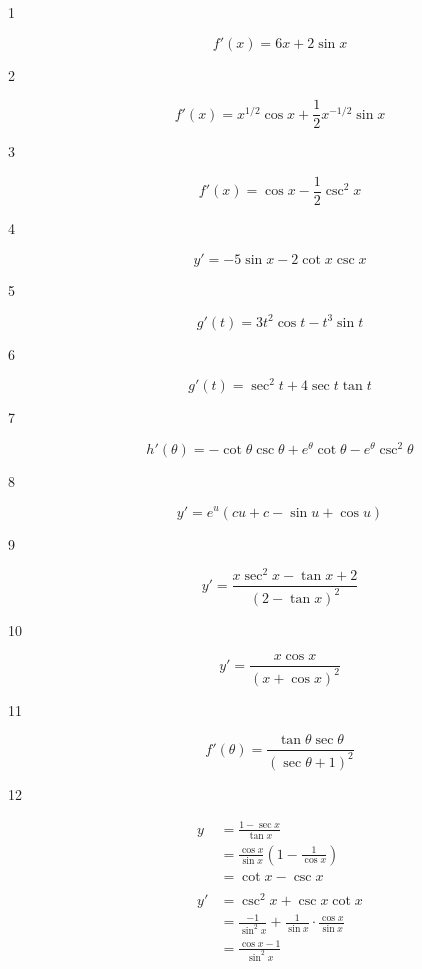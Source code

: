 \documentclass[letterpaper, landscape]{exam}
\begin{document}
  \begin{description}

    \item[1] 
      \[
        f'(x) = \boxed{ 6x + 2 \sin x }
      \]

    \item[2] 
      \[
        f'(x) = \boxed{ x^{1/2} \cos{x} + \frac{1}{2} x^{-1/2} \sin x }
      \]

    \item[3] 
      \[
        f'(x) = \boxed{ \cos x - \frac{1}{2} \csc^2 x }
      \]

    \item[4] 
      \[
        y' = \boxed{ - 5 \sin x - 2 \cot x \csc x }
      \]

    \item[5] 
      \[
        g'(t) = \boxed{ 3 t^2 \cos t - t^3 \sin t }
      \]

    \item[6] 
      \[
        g'(t) = \boxed{ \sec^2 t + 4 \sec t \tan t }
      \]

    \item[7] 
      \[
        h'(\theta) = \boxed{ - \cot \theta \csc \theta + e^{\theta} \cot \theta - e^{\theta} \csc^2 \theta }
      \]

    \item[8] 
      \[
        y' = \boxed{ e^u (c u + c - \sin u + \cos u) }
      \]

    \item[9] 
      \[
        y' = \boxed{ \frac{ x \sec^2 x - \tan x + 2}{( 2 - \tan x )^2} }
      \]

    \item[10] 
      \[
        y' = \boxed{ \frac{x \cos x}{(x + \cos x)^2} }
      \]

    \item[11] 
      \[
        f'(\theta) = \boxed{ \frac{\tan \theta \sec \theta}{(\sec \theta + 1)^2} }
      \]

    \item[12] 
      \begin{align*}
        y  & = \frac{1 - \sec x}{\tan x} \\
           & = \frac{\cos x}{\sin x} \left( 1 - \frac{1}{\cos x} \right) \\
           & = \cot x - \csc x \\
        \\
        y' & = \csc^2 x + \csc x \cot x \\
           & = \frac{-1}{\sin^2 x} + \frac{1}{\sin x} \cdot \frac{\cos x}{\sin x} \\
           & = \boxed{ \frac{\cos x - 1}{\sin^2 x} } \\
      \end{align*}


\end{description}
\end{document}
